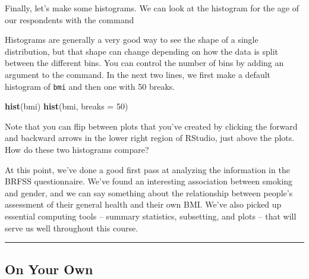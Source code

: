 \documentclass[]{article}
\newenvironment{Shaded}{\begin{snugshade}}{\end{snugshade}}
\newcommand{\KeywordTok}[1]{\textcolor[rgb]{0.13,0.29,0.53}{\textbf{{#1}}}}
\newcommand{\DataTypeTok}[1]{\textcolor[rgb]{0.13,0.29,0.53}{{#1}}}
\newcommand{\DecValTok}[1]{\textcolor[rgb]{0.00,0.00,0.81}{{#1}}}
\newcommand{\NormalTok}[1]{{#1}}
\begin{document}
Finally, let's make some histograms. We can look at the histogram for
the age of our respondents with the command

\begin{Shaded}
\end{Shaded}

Histograms are generally a very good way to see the shape of a single
distribution, but that shape can change depending on how the data is
split between the different bins. You can control the number of bins by
adding an argument to the command. In the next two lines, we first make
a default histogram of \texttt{bmi} and then one with 50 breaks.

\begin{Shaded}
\begin{Highlighting}[]
\KeywordTok{hist}\NormalTok{(bmi)}
\KeywordTok{hist}\NormalTok{(bmi, }\DataTypeTok{breaks =} \DecValTok{50}\NormalTok{)}
\end{Highlighting}
\end{Shaded}

Note that you can flip between plots that you've created by clicking the
forward and backward arrows in the lower right region of RStudio, just
above the plots. How do these two histograms compare?

At this point, we've done a good first pass at analyzing the information
in the BRFSS questionnaire. We've found an interesting association
between smoking and gender, and we can say something about the
relationship between people's assessment of their general health and
their own BMI. We've also picked up essential computing tools -- summary
statistics, subsetting, and plots -- that will serve us well throughout
this course.

\begin{center}\rule{0.5\linewidth}{\linethickness}\end{center}

\subsection{On Your Own}\label{on-your-own}
\end{document}
